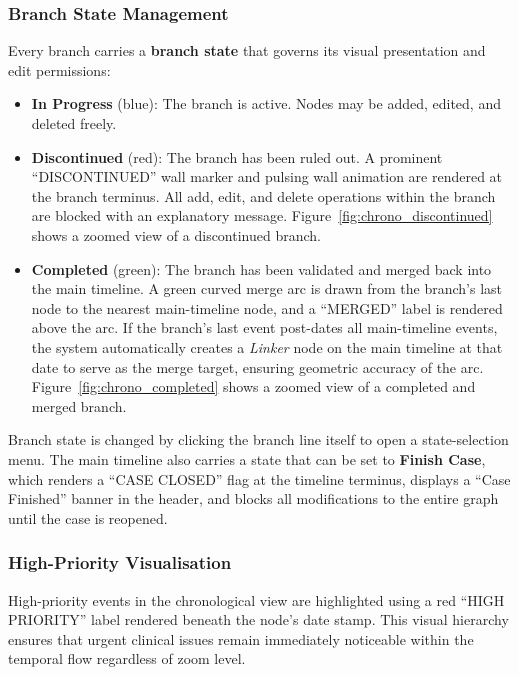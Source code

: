 \subsubsection{Branch State Management}

Every branch carries a \textbf{branch state} that governs its visual
presentation and edit permissions:

\begin{itemize}
    \item \textbf{In Progress} (blue): The branch is active. Nodes may be
          added, edited, and deleted freely.
    \item \textbf{Discontinued} (red): The branch has been ruled out. A
          prominent ``DISCONTINUED'' wall marker and pulsing wall animation are
          rendered at the branch terminus. All add, edit, and delete operations
          within the branch are blocked with an explanatory message.
          Figure~\ref{fig:chrono_discontinued} shows a zoomed view of a
          discontinued branch.
    \item \textbf{Completed} (green): The branch has been validated and merged
          back into the main timeline. A green curved merge arc is drawn from
          the branch's last node to the nearest main-timeline node, and a
          ``MERGED'' label is rendered above the arc. If the branch's last event
          post-dates all main-timeline events, the system automatically creates
          a \textit{Linker} node on the main timeline at that date to serve as
          the merge target, ensuring geometric accuracy of the arc.
          Figure~\ref{fig:chrono_completed} shows a zoomed view of a completed
          and merged branch.
\end{itemize}

Branch state is changed by clicking the branch line itself to open a
state-selection menu. The main timeline also carries a state that can be
set to \textbf{Finish Case}, which renders a ``CASE CLOSED'' flag at the
timeline terminus, displays a ``Case Finished'' banner in the header, and
blocks all modifications to the entire graph until the case is reopened.

\subsubsection{High-Priority Visualisation}

High-priority events in the chronological view are highlighted using a red
``HIGH PRIORITY'' label rendered beneath the node's date stamp. This visual
hierarchy ensures that urgent clinical issues remain immediately noticeable
within the temporal flow regardless of zoom level.

